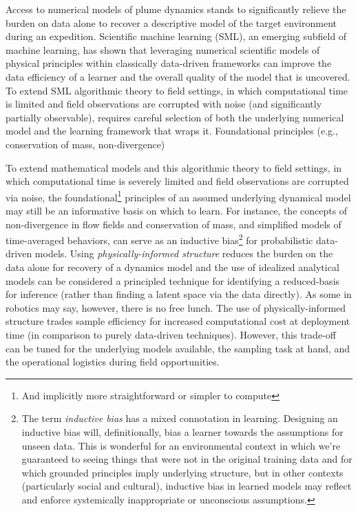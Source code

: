 

Access to numerical models of plume dynamics stands to significantly relieve the burden on data alone to recover a descriptive model of the target environment during an expedition.
Scientific machine learning (SML), an emerging subfield of machine learning, has shown that leveraging numerical scientific models of physical principles within classically data-driven frameworks\autocite{raissi2019physics, sapsis2009dynamically, mohan2019compressed,raissi2018numerical,kulkarni2019advection, brunton2016discovering,jiahao2020learning} can improve the data efficiency of a learner and the overall quality of the model that is uncovered.
To extend SML algorithmic theory to field settings, in which computational time is limited and field observations are corrupted with noise (and significantly partially observable), requires careful selection of both the underlying numerical model and the learning framework that wraps it.
Foundational principles (e.g., conservation of mass, non-divergence) 



To extend mathematical models and this algorithmic theory to field settings, in which computational time is severely limited and field observations are corrupted via noise, the foundational\footnote{And implicitly more straightforward or simpler to compute} principles of an assumed underlying dynamical model may still be an informative basis on which to learn.
For instance, the concepts of non-divergence in flow fields and conservation of mass, and simplified models of time-averaged behaviors, can serve as an inductive bias\footnote{The term \emph{inductive bias} has a mixed connotation in learning. Designing an inductive bias will, definitionally, bias a learner towards the assumptions for unseen data. This is wonderful for an environmental context in which we're guaranteed to seeing things that were not in the original training data and for which grounded principles imply underlying structure, but in other contexts (particularly social and cultural), inductive bias in learned models may reflect and enforce systemically inappropriate or unconscious assumptions.} for probabilistic data-driven models.
Using \emph{physically-informed structure} reduces the burden on the data alone for recovery of a dynamics model and the use of idealized analytical models can be considered a principled technique for identifying a reduced-basis for inference (rather than finding a latent space via the data directly).
As some in robotics may say, however, there is no free lunch.
The use of physically-informed structure trades sample efficiency for increased computational cost at deployment time (in comparison to purely data-driven techniques).
However, this trade-off can be tuned for the underlying models available, the sampling task at hand, and the operational logistics during field opportunities.

